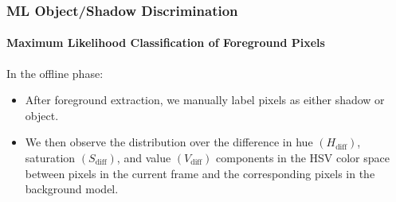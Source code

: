 \fi


\begin{frame}
    \frametitle{ML Object/Shadow Discrimination}
    \framesubtitle{Maximum Likelihood Classification of Foreground Pixels}

    In the \alert{offline} phase: 
  
    \begin{itemize}
        \item After foreground extraction, we manually label pixels 
            as either shadow or object. 
        \item We then observe the distribution over the difference in 
            hue $(H_\text{diff})$, saturation $(S_\text{diff} )$, and 
            value $(V_\text{diff} )$ components in the HSV color space
            between pixels in the current frame and the corresponding
            pixels in the background model.
    \end{itemize}

\end{frame}


